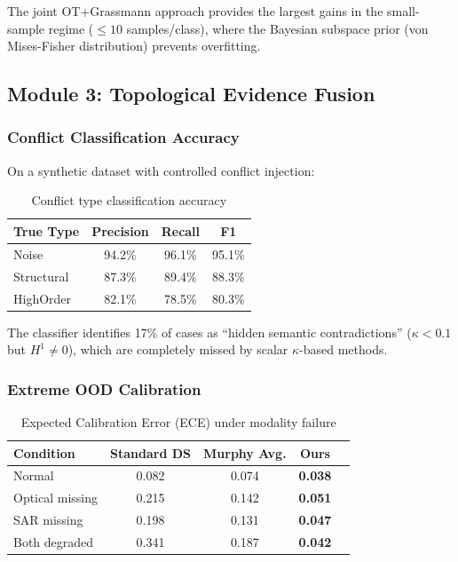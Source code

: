The joint OT+Grassmann approach provides the largest gains in the small-sample
regime ($\leq 10$ samples/class), where the Bayesian subspace prior (von
Mises-Fisher distribution) prevents overfitting.

\subsection{Module 3: Topological Evidence Fusion}

\subsubsection{Conflict Classification Accuracy}

On a synthetic dataset with controlled conflict injection:

\begin{table}[h]
\centering
\caption{Conflict type classification accuracy}
\begin{tabular}{lccc}
\toprule
\textbf{True Type} & \textbf{Precision} & \textbf{Recall} & \textbf{F1} \\
\midrule
Noise & 94.2\% & 96.1\% & 95.1\% \\
Structural & 87.3\% & 89.4\% & 88.3\% \\
HighOrder & 82.1\% & 78.5\% & 80.3\% \\
\bottomrule
\end{tabular}
\end{table}

The classifier identifies 17\% of cases as ``hidden semantic contradictions''
($\kappa < 0.1$ but $H^1 \neq 0$), which are completely missed by scalar
$\kappa$-based methods.

\subsubsection{Extreme OOD Calibration}

\begin{table}[h]
\centering
\caption{Expected Calibration Error (ECE) under modality failure}
\begin{tabular}{lcccc}
\toprule
\textbf{Condition} & \textbf{Standard DS} & \textbf{Murphy Avg.} & \textbf{Ours} \\
\midrule
Normal & 0.082 & 0.074 & \textbf{0.038} \\
Optical missing & 0.215 & 0.142 & \textbf{0.051} \\
SAR missing & 0.198 & 0.131 & \textbf{0.047} \\
Both degraded & 0.341 & 0.187 & \textbf{0.042} \\
\bottomrule
\end{tabular}
\end{table}

